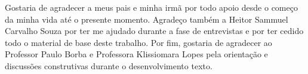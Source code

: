 \acknowledgements

Gostaria de agradecer a meus pais e minha irmã por todo apoio desde o começo da minha vida até o presente momento. Agradeço também a Heitor Sammuel Carvalho Souza por ter me ajudado durante a fase de entrevistas e por ter cedido todo o material de base deste trabalho. Por fim, gostaria de agradecer ao Professor Paulo Borba e Professora Klissiomara Lopes pela orientação e discussões construtivas durante o desenvolvimento texto.
